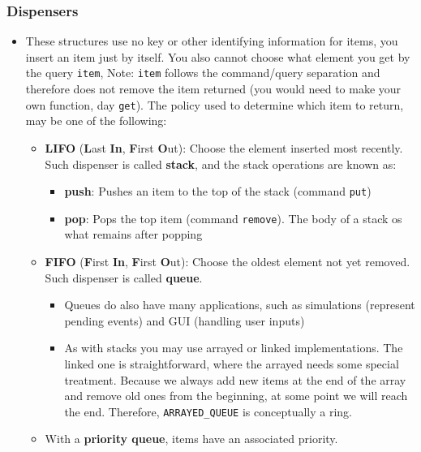 \documentclass[a4paper]{article}
\newcommand{\inline}[1]{\lstinline!#1!}%
\begin{document}
\subsubsection{Dispensers}
\begin{itemize}
\item These structures use no key or other identifying information for items, you insert an item just by itself. You also cannot choose what element you get by the query \inline{item}, Note: \inline{item} follows the command/query separation and therefore does not remove the item returned (you would need to make your own function, day \inline{get}). The policy used to determine which item to return, may be one of the following:
\begin{itemize}
\item \textbf{LIFO} (\textbf{L}ast \textbf{In}, \textbf{F}irst \textbf{O}ut): Choose the element inserted most recently. Such dispenser is called \textbf{stack}, and the stack operations are known as:
\begin{itemize}
\item \textbf{push}: Pushes an item to the top of the stack (command \inline{put})
\item \textbf{pop}: Pops the top item (command \inline{remove}). The body of a stack os what remains after popping
\end{itemize}
\item \textbf{FIFO} (\textbf{F}irst \textbf{In}, \textbf{F}irst \textbf{O}ut): Choose the oldest element not yet removed. Such dispenser is called \textbf{queue}.
\begin{itemize}
\item Queues do also have many applications, such as simulations (represent pending events) and GUI (handling user inputs)
\item As with stacks you may use arrayed or linked implementations. The linked one is straightforward, where the arrayed needs some special treatment. Because we always add new items at the end of the array and remove old ones from the beginning, at some point we will reach the end. Therefore, \inline{ARRAYED_QUEUE} is conceptually a ring.
\end{itemize}
\item With a \textbf{priority queue}, items have an associated priority.
\end{itemize}
\end{itemize}
\end{document}
